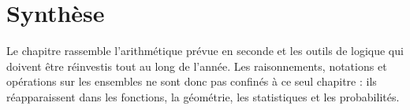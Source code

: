 \section{Synthèse}

Le chapitre rassemble l'arithmétique prévue en seconde et les outils de logique qui doivent être réinvestis tout au long de l'année. Les raisonnements, notations et opérations sur les ensembles ne sont donc pas confinés à ce seul chapitre : ils réapparaissent dans les fonctions, la géométrie, les statistiques et les probabilités.
